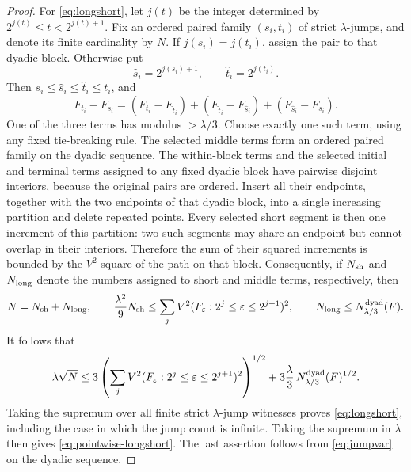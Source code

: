 \documentclass[11pt]{article}
\numberwithin{equation}{section}
\theoremstyle{remark}
\theoremstyle{definition}
\begin{document}
\begin{proof}
For \eqref{eq:longshort}, let $j(t)$ be the integer determined by
$2^{j(t)}\le t<2^{j(t)+1}$.  Fix an ordered paired family $(s_i,t_i)$ of
strict $\lambda$-jumps, and denote its finite cardinality by $N$.  If
$j(s_i)=j(t_i)$, assign the pair to that
dyadic block.  Otherwise put
\[
 \widehat s_i=2^{j(s_i)+1},\qquad
 \widehat t_i=2^{j(t_i)}.
\]
Then $s_i\le\widehat s_i\le\widehat t_i\le t_i$, and
\[
 F_{t_i}-F_{s_i}
 =(F_{t_i}-F_{\widehat t_i})
 +(F_{\widehat t_i}-F_{\widehat s_i})
 +(F_{\widehat s_i}-F_{s_i}).
\]
One of the three terms has modulus $>\lambda/3$.  Choose exactly one such
term, using any fixed tie-breaking rule.  The selected middle terms form
an ordered paired family on the dyadic sequence.  The within-block terms
and the selected initial and terminal terms assigned to any fixed dyadic
block have pairwise disjoint interiors, because the original pairs are
ordered.  Insert all their endpoints, together with the two endpoints of
that dyadic block, into a single increasing partition and delete repeated
points.  Every selected short segment is then one increment of this
partition: two such segments may share an endpoint but cannot overlap in
their interiors.  Therefore the sum of their squared increments is bounded
by the $V^2$ square of the path on that block.  Consequently, if
$N_{\rm sh}$ and $N_{\rm long}$ denote the
numbers assigned to short and middle terms, respectively, then
\[
 N=N_{\rm sh}+N_{\rm long},
 \qquad
 \frac{\lambda^2}{9}N_{\rm sh}
 \le \sum_j V^2(F_\varepsilon:2^j\le\varepsilon\le2^{j+1})^2,
 \qquad
 N_{\rm long}\le N^{\rm dyad}_{\lambda/3}(F).
\]
It follows that
\[
 \lambda\sqrt N
 \le3\left(\sum_j
 V^2(F_\varepsilon:2^j\le\varepsilon\le2^{j+1})^2\right)^{1/2}
 +3\frac\lambda3\,N^{\rm dyad}_{\lambda/3}(F)^{1/2}.
\]
Taking the supremum over all finite strict $\lambda$-jump witnesses proves
\eqref{eq:longshort}, including the case in which the jump count is
infinite.  Taking the supremum in $\lambda$ then gives
\eqref{eq:pointwise-longshort}.  The last assertion follows from
\eqref{eq:jumpvar} on the dyadic sequence.
\end{proof}
\end{document}
